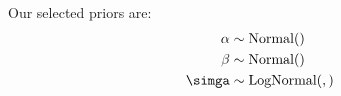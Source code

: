 Our selected priors are:\\
\begin{align*}
    \alpha &\sim \text{Normal}()\\
    \beta &\sim \text{Normal}()\\
    \simga &\sim \text{LogNormal}(,)
\end{align*}